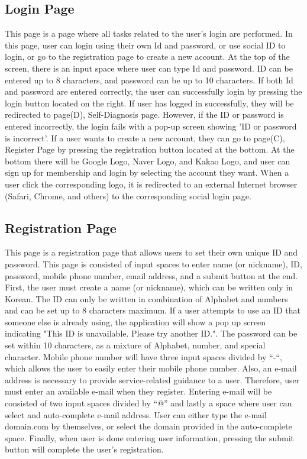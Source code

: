 \documentclass[conference]{IEEEtran}
\begin{document}
\subsection{Login Page}
This page is a page where all tasks related to the user's login are performed. In this page, user can login using their own Id and password, or use social ID to login, or go to the registration page to create a new account. At the top of the screen, there is an input space where user can type Id and password. ID can be entered up to 8 characters, and password can be up to 10 characters. If both Id and password are entered correctly, the user can successfully login by pressing the login button located on the right. If user has logged in successfully, they will be redirected to page(D), Self-Diagnosis page. However, if the ID or password is entered incorrectly, the login fails with a pop-up screen showing 'ID or password is incorrect'. If a user wants to create a new account, they can go to page(C), Register Page by pressing the registration button located at the bottom. At the bottom there will be Google Logo, Naver Logo, and Kakao Logo, and user can sign up for membership and login by selecting the account they want. When a user click the corresponding logo, it is redirected to an external Internet browser (Safari, Chrome, and others) to the corresponding social login page.
\\
\subsection{Registration Page}
This page is a registration page that allows users to set their own unique ID and password. This page is consisted of input spaces to enter name (or nickname), ID, password, mobile phone number, email address, and a submit button at the end. First, the user must create a name (or nickname), which can be written only in Korean. The ID can only be written in combination of Alphabet and numbers and can be set up to 8 characters maximum. If a user attempts to use an ID that someone else is already using, the application will show a pop up screen indicating "This ID is unavailable. Please try another ID.". The password can be set within 10 characters, as a mixture of Alphabet, number, and special character. Mobile phone number will have three input spaces divided by “-“, which allows the user to easily enter their mobile phone number. Also, an e-mail address is necessary to provide service-related guidance to a user. Therefore, user must enter an available e-mail when they register. Entering e-mail will be consisted of two input spaces divided by “@” and lastly a space where user can select and auto-complete e-mail address. User can either type the e-mail domain.com by themselves, or select the domain provided in the auto-complete space. Finally, when user is done entering user information, pressing the submit button will complete the user's registration.
\\
\end{document}
